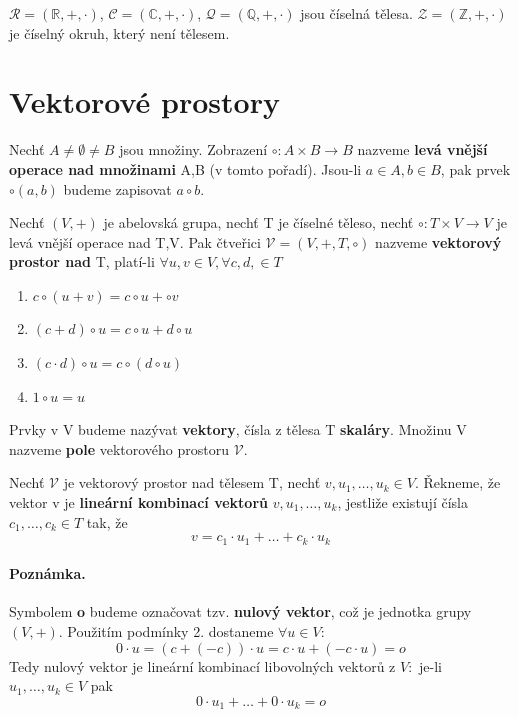 \begin{example}
	 $ \mathscr{R} = (\mathbb{R}, + , \cdot)$,  $\mathscr{C} = (\mathbb{C}, + , \cdot)$, $ \mathscr{Q} = (\mathbb{Q}, + , \cdot)$ jsou číselná tělesa. $\mathscr{Z} = (\mathbb{Z}, + , \cdot)$ je číselný okruh, který není tělesem.
\end{example}

\section{Vektorové prostory}
\begin{definition}
	Nechť $A \not= \emptyset \not= B$ jsou množiny. Zobrazení $\circ : A \times B \rightarrow B$ nazveme \textbf{levá vnější operace nad množinami} A,B (v tomto pořadí). Jsou-li $a \in A, b \in B$, pak prvek $\circ(a,b)$ budeme zapisovat $a \circ b$.
\end{definition}

\begin{definition}
	Nechť $(V, +)$ je abelovská grupa, nechť T je číselné těleso, nechť $\circ : T \times V \rightarrow V$ je levá vnější operace nad T,V. Pak čtveřici $\mathscr{V} = (V, +, T, \circ)$ nazveme \textbf{vektorový prostor nad} T, platí-li $\forall u,v \in V, \forall c,d, \in T$
	\begin{enumerate}
		\item $c \circ (u + v) = c \circ u + \circ v$
		\item $(c + d) \circ u = c \circ u + d \circ u$
		\item $(c \cdot d) \circ u = c \circ (d \circ u)$
		\item $1 \circ u = u$
	\end{enumerate}
	Prvky v V budeme nazývat \textbf{vektory}, čísla z tělesa T \textbf{skaláry}. Množinu V nazveme \textbf{pole} vektorového prostoru $\mathscr{V}$.
\end{definition}

\begin{definition}
	Nechť  $\mathscr{V}$ je vektorový prostor nad tělesem T, nechť $v,u_1,\dots,u_k \in V$. Řekneme, že vektor v je \textbf{lineární kombinací vektorů}  $v,u_1,\dots,u_k$, jestliže existují čísla $c_1, \dots, c_k \in T$ tak, že $$v = c_1 \cdot u_1 + \dots + c_k \cdot u_k$$
\end{definition}
\paragraph{Poznámka.} Symbolem \textbf{o} budeme označovat tzv. \textbf{nulový vektor}, což je jednotka grupy $(V, +)$. Použitím podmínky 2. dostaneme $\forall u \in V:$ $$0 \cdot u = (c + (-c)) \cdot u = c \cdot u + (-c \cdot u) = o$$
Tedy nulový vektor je lineární kombinací libovolných vektorů z $V: $ je-li $u_1,\dots,u_k \in V$ pak $$0 \cdot u_1 + \dots + 0 \cdot u_k = o$$


